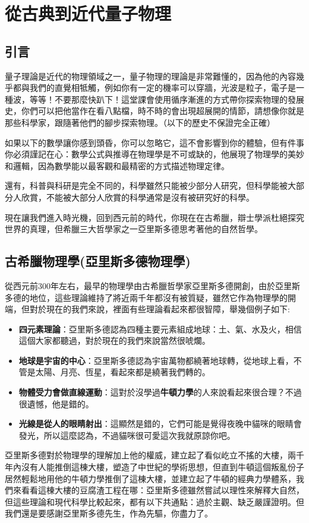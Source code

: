 \chapter{從古典到近代量子物理}
\setcounter{section}{-1}
\section{引言}
量子理論是近代的物理領域之一，量子物理的理論是非常難懂的，因為他的內容幾乎都與我們的直覺相牴觸，例如你有一定的機率可以穿牆，光波是粒子，電子是一種波，等等！不要那麼快趴下！這堂課會使用循序漸進的方式帶你探索物理的發展史，你們可以把他當作在看八點檔，時不時的會出現超展開的情節，請想像你就是那些科學家，跟隨著他們的腳步探索物理。（以下的歷史不保證完全正確）

如果以下的數學讓你感到頭昏，你可以忽略它，這不會影響到你的體驗，但有件事你必須謹記在心：數學公式與推導在物理學是不可或缺的，他展現了物理學的美妙和邏輯，因為數學能以最客觀和最精密的方式描述物理定律。

還有，科普與科研是完全不同的，科學雖然只能被少部分人研究，但科學能被大部分人欣賞，不能被大部分人欣賞的科學通常是沒有被研究好的科學。

現在讓我們進入時光機，回到西元前的時代，你現在在古希臘，辯士學派杜絕探究世界的真理，但希臘三大哲學家之一亞里斯多德思考著他的自然哲學。
\section{古希臘物理學(亞里斯多德物理學)}
從西元前300年左右，最早的物理學由古希臘哲學家亞里斯多德開創，由於亞里斯多德的地位，這些理論維持了將近兩千年都沒有被質疑，雖然它作為物理學的開端，但對於現在的我們來說，裡面有些理論看起來都很智障，舉幾個例子如下:
\begin{itemize}
\item \textbf{四元素理論}：亞里斯多德認為四種主要元素組成地球：土、氣、水及火，相信這個大家都聽過，對於現在的我們來說當然很唬爛。
\item \textbf{地球是宇宙的中心}：亞里斯多德認為宇宙萬物都繞著地球轉，從地球上看，不管是太陽、月亮、恆星，看起來都是繞著我們轉的。
\item \textbf{物體受力會做直線運動}：這對於沒學過\textbf{牛頓力學}的人來說看起來很合理？不過很遺憾，他是錯的。
\item \textbf{光線是從人的眼睛射出}：這顯然是錯的，它們可能是覺得夜晚中貓咪的眼睛會發光，所以這麼認為，不過貓咪很可愛這次我就原諒你吧。
\end{itemize}
亞里斯多德對於物理學的理解加上他的權威，建立起了看似屹立不搖的大樓，兩千年內沒有人能推倒這棟大樓，塑造了中世紀的學術思想，但直到牛頓這個叛亂份子居然輕鬆地用他的牛頓力學推倒了這棟大樓，並建立起了牛頓的經典力學體系，我們來看看這棟大樓的豆腐渣工程在哪：亞里斯多德雖然嘗試以理性來解釋大自然，但這些理論和現代科學比較起來，都有以下共通點：過於主觀、缺乏嚴謹證明。但我們還是要感謝亞里斯多德先生，作為先驅，你盡力了。

